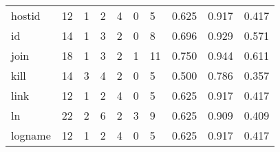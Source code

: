 \begin{longtable}{lp{1.3cm}p{1.3cm}p{1.3cm}p{1.3cm}p{1.3cm}p{1.3cm}p{1.3cm}p{1.3cm}p{1.3cm}}
hostid    &                     12 &                                             1 &                                            2 &                                           4 &                                            0 &                                          5 &                                0.625 &                                  0.917 &                                0.417 \\
id        &                     14 &                                             1 &                                            3 &                                           2 &                                            0 &                                          8 &                                0.696 &                                  0.929 &                                0.571 \\
join      &                     18 &                                             1 &                                            3 &                                           2 &                                            1 &                                         11 &                                0.750 &                                  0.944 &                                0.611 \\
kill      &                     14 &                                             3 &                                            4 &                                           2 &                                            0 &                                          5 &                                0.500 &                                  0.786 &                                0.357 \\
link      &                     12 &                                             1 &                                            2 &                                           4 &                                            0 &                                          5 &                                0.625 &                                  0.917 &                                0.417 \\
ln        &                     22 &                                             2 &                                            6 &                                           2 &                                            3 &                                          9 &                                0.625 &                                  0.909 &                                0.409 \\
logname   &                     12 &                                             1 &                                            2 &                                           4 &                                            0 &                                          5 &                                0.625 &                                  0.917 &                                0.417 \\

\end{longtable}
